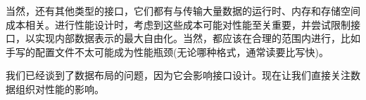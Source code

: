 当然，还有其他类型的接口，它们都有与传输大量数据的运行时、内存和存储空间成本相关。进行性能设计时，考虑到这些成本可能对性能至关重要，并尝试限制接口，以实现内部数据表示的最大自由化。当然，都应该在合理的范围内进行，比如手写的配置文件不太可能成为性能瓶颈(无论哪种格式，通常读要比写快)。 

我们已经谈到了数据布局的问题，因为它会影响接口设计。现在让我们直接关注数据组织对性能的影响。



























